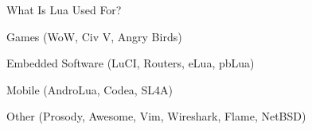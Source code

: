 \begin{itemslide}{What Is Lua Used For?}
\item Games (WoW, Civ V, Angry Birds)
\item Embedded Software (LuCI, Routers, eLua, pbLua)
\item Mobile (AndroLua, Codea, SL4A)
\item Other (Prosody, Awesome, Vim, Wireshark, Flame, NetBSD)
\end{itemslide}
